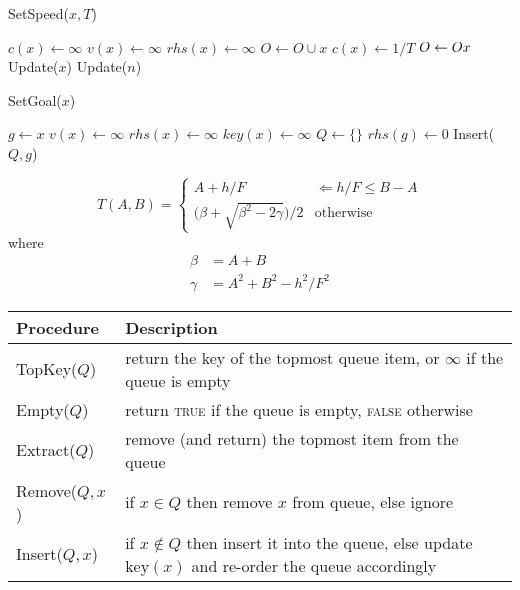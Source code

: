\documentclass[twocolumn]{article}
\newcommand{\key}{\text{key}}
\begin{document}
\begin{algorithm}
  \caption{SetSpeed($x, T$)}
  \begin{algorithmic}
        \STATE $c(x) \leftarrow \infty$
        \STATE $v(x) \leftarrow \infty$
        \STATE $rhs(x) \leftarrow \infty$
        \STATE $O \leftarrow O \cup {x}$
      \ELSE
        \STATE $c(x) \leftarrow 1/T$
        \STATE $O \leftarrow O \\ x$
      \ENDIF
      \STATE Update($x$)
        \STATE Update($n$)
      \ENDFOR
    \ENDIF
  \end{algorithmic}
\end{algorithm}

\begin{algorithm}
  \caption{SetGoal($x$)}
  \begin{algorithmic}
    \STATE $g \leftarrow x$
      \STATE
      \STATE $v(x) \leftarrow \infty$
      \STATE $rhs(x) \leftarrow \infty$
      \STATE $key(x) \leftarrow \infty$
    \ENDFOR
    \STATE $Q \leftarrow \{\}$
    \STATE $rhs(g) \leftarrow 0$
    \STATE Insert($Q,g$)
  \end{algorithmic}
\end{algorithm}

\begin{equation}
  T(A,B) =
  \begin{cases}
    A + h/F                                & \Leftarrow h/F \leq B-A \\
    \big(\beta + \sqrt{\beta^2 - 2\gamma}\big) / 2 & \text{otherwise}
  \end{cases}
\end{equation}
\noindent where
\begin{subequations}
  \begin{align}
    \beta &= A + B \\
    \gamma &= A^2 + B^2 - h^2/F^2
  \end{align}
\end{subequations}

\begin{table}
  \centering
  \begin{tabular}{@{}p{}p{}@{}}
    \toprule
    Procedure & Description \\
    \midrule
    TopKey($Q$)    & return the key of the topmost queue item, or $\infty$ if the queue is empty \\
    Empty($Q$)     & return \textsc{true} if the queue is empty, \textsc{false} otherwise \\
    Extract($Q$)   & remove (and return) the topmost item from the queue \\
    Remove($Q, x$) & if $x\in Q$ then remove $x$ from queue, else ignore \\
    Insert($Q, x$) & if $x\notin Q$ then insert it into the queue, else update $\key(x)$ and re-order the queue accordingly \\
    \bottomrule
  \end{tabular}
\end{table}
\end{document}
